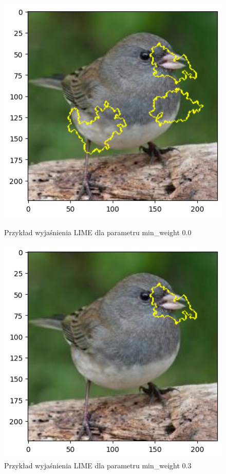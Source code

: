 \begin{figure}
	\centering
	\begin{minipage}[b]{0.3\textwidth}
		\includegraphics[width=.9\textwidth]{img/parameters/lime/min_weight_00}
		\caption{Przykład wyjaśnienia LIME dla parametru min\_weight 0.0}  \label{rys:parameters_lime_numsamples_5}
	\end{minipage}
	\begin{minipage}[b]{0.3\textwidth}
		\centering\includegraphics[width=.9\textwidth]{img/parameters/lime/min_weight_03}
		\caption{Przykład wyjaśnienia LIME dla parametru min\_weight 0.3}  \label{rys:parameters_lime_numsamples_1000}
	\end{minipage}
\end{figure}


